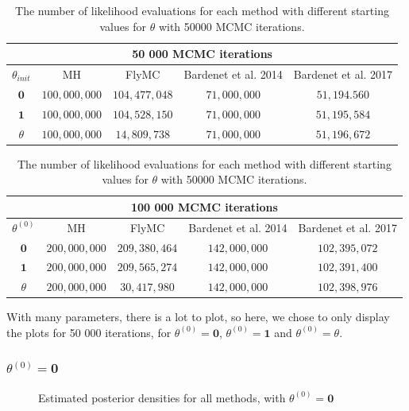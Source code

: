  \begin{table}
    \centering
\begin{tabular}{|c|c|c|c|c|}
  \hline
    \multicolumn{5}{|c|}{50 000 MCMC iterations} \\
    \hline
\hline
        $\theta_{init}$ &  MH & FlyMC & Bardenet et al. 2014 & Bardenet et al. 2017\\ 
         \hline \hline$\mathbf{0}$ & $100,000,000$ & $104,477,048$ & $71,000,000$ & $51,194.560$ \\
        $\mathbf{1}$ & $100,000,000$ & $104,528,150$ & $71,000,000$ & $51,195,584$ \\
        $\theta$ & $100,000,000$ & $14,809,738$ & $71,000,000$ & $51,196,672$
        \\ \hline
\end{tabular}
\caption{The number of likelihood evaluations for each method with different starting values for $\theta$ with 50000 MCMC iterations.}
\label{tab:multiple_evals_50k}
\end{table} 

 \begin{table}
    \centering
\begin{tabular}{|c|c|c|c|c|}
  \hline
    \multicolumn{5}{|c|}{100 000 MCMC iterations} \\
    \hline
\hline
        $\theta^{\left(0\right)}$ &  MH & FlyMC & Bardenet et al. 2014 & Bardenet et al. 2017\\ 
         \hline \hline$\mathbf{0}$ & $200,000,000$ & $209,380,464$ & $142,000,000$ & $102,395,072$ \\
        $\mathbf{1}$ & $200,000,000$ & $209,565,274$ & $142,000,000$ & $102,391,400$ \\
        $\theta$ & $200,000,000$ & $30,417,980$ & $142,000,000$ & $102,398,976$
        \\ \hline
\end{tabular}
\caption{The number of likelihood evaluations for each method with different starting values for $\theta$ with 50000 MCMC iterations.}
\label{tab:multiple_evals_100k}
\end{table} 
With many parameters, there is a lot to plot, so here, we chose to only display the plots for 50 000 iterations, for  $\theta^{\left(0\right)} = \mathbf{0}$, $\theta^{\left(0\right)} = \mathbf{1}$ and $\theta^{\left(0\right)} = \theta$.   

\subsubsection{$\theta^{\left(0\right)} = \mathbf{0}$}
\begin{figure}%
    \centering
    \qquad
    \caption{Estimated posterior densities for all methods, with $\theta^{\left(0\right)} = \mathbf{0}$}%
    \label{fig:density_50k_02_06_theta1}%
\end{figure}


